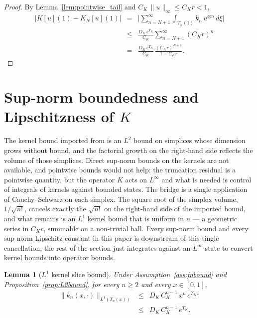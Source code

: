 \documentclass[10pt,a4paper]{amsart}
\newtheorem{lemma}{Lemma}
\newcommand{\Linf}{L^\infty}
\begin{document}
\begin{proof}
By Lemma~\ref{lem:pointwise_tail} and $C_K\,\|u\|_\infty \le C_K r < 1$,
\begin{eqnarray}
\bigl|K[u](1) - K_N[u](1)\bigr| &=& \biggl|\sum_{n=N+1}^\infty \int_{T_n(1)} k_n\, u^{\otimes n}\, d\xi\biggr| \nonumber\\
&\le & \frac{D_K\, e^{\Upsilon_K}}{C_K} \sum_{n=N+1}^\infty (C_K r)^n \nonumber\\
&=& \frac{D_K\, e^{\Upsilon_K}}{C_K}\,\frac{(C_K r)^{N+1}}{1 - C_K r}.
\label{eq:tail_proof}
\end{eqnarray}
\end{proof}

\section{Sup-norm boundedness and Lipschitzness of $K$}\label{sec:KLip}

The kernel bound imported from \cite{krstic2026feedbacklinearizationhyperbolicpdes} is an $L^2$ bound on simplices whose dimension grows without bound, and the factorial growth on the right-hand side reflects the volume of those simplices. Direct sup-norm bounds on the kernels are not available, and pointwise bounds would not help: the truncation residual is a pointwise quantity, but the operator $K$ acts on $\Linf$ and what is needed is control of integrals of kernels against bounded states. The bridge is a single application of Cauchy--Schwarz on each simplex. The square root of the simplex volume, $1/\sqrt{n!}$, cancels exactly the $\sqrt{n!}$ on the right-hand side of the imported bound, and what remains is an $L^1$ kernel bound that is uniform in $n$ --- a geometric series in $C_K r$, summable on a non-trivial ball. Every sup-norm bound and every sup-norm Lipschitz constant in this paper is downstream of this single cancellation; the rest of the section just integrates against an $\Linf$ state to convert kernel bounds into operator bounds.

\begin{lemma}[$L^1$ kernel slice bound]\label{lem:knL1}
Under Assumption~\ref{ass:fnbound} and Proposition~\ref{prop:L2bound}, for every $n \ge 2$ and every $x \in [0,1]$,
\begin{eqnarray}
\|k_n(x,\cdot)\|_{L^1(T_n(x))} &\le& D_K\, C_K^{n-1}\, x^n\, e^{\Upsilon_K x} \nonumber \\
&\le& D_K\, C_K^{n-1}\, e^{\Upsilon_K}.
\label{eq:knL1}
\end{eqnarray}
\end{lemma}
\end{document}
